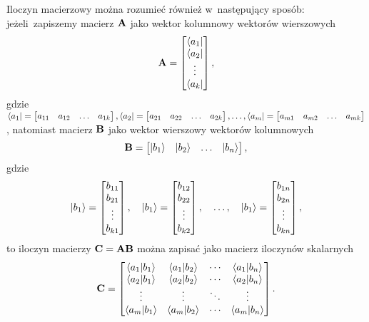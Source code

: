 Iloczyn macierzowy można rozumieć również w~następujący sposób: jeżeli~zapiszemy
macierz $\mathbf{A}$ jako wektor kolumnowy wektorów wierszowych
$$
	\mathbf{A} = \begin{bmatrix}
		\bra{a_1} \\
		\bra{a_2} \\
		\vdots    \\
		\bra{a_k}
	\end{bmatrix},
$$
gdzie $\bra{a_1} = \begin{bmatrix}a_{11} & a_{12} & \dots & a_{1k} \end{bmatrix},
	\bra{a_2} = \begin{bmatrix}a_{21} & a_{22} & \dots & a_{2k} \end{bmatrix}, \dots,
	\bra{a_m} = \begin{bmatrix}a_{m1} & a_{m2} & \dots & a_{mk} \end{bmatrix}$,
natomiast macierz $\mathbf{B}$ jako wektor wierszowy wektorów kolumnowych
$$
	\mathbf{B} = \begin{bmatrix}
		\ket{b_1} &
		\ket{b_2} &
		\dots     &
		\ket{b_n}
	\end{bmatrix},
$$
gdzie
$$
	\ket{b_1} =
	\begin{bmatrix}
		b_{11} \\
		b_{21} \\
		\vdots \\
		b_{k1}
	\end{bmatrix}, \quad
	\ket{b_1} =
	\begin{bmatrix}
		b_{12} \\
		b_{22} \\
		\vdots \\
		b_{k2}\end{bmatrix},\quad \dots, \quad
	\ket{b_1} =
	\begin{bmatrix}
		b_{1n} \\
		b_{2n} \\
		\vdots \\
		b_{kn}
	\end{bmatrix},
$$
to iloczyn macierzy $\mathbf{C}=\mathbf{A}\mathbf{B}$ można zapisać jako macierz iloczynów skalarnych
$$
	\mathbf{C}=
	\begin{bmatrix}
		\braket{a_1}{b_1} & \braket{a_1}{b_2} & \cdots & \braket{a_1}{b_n} \\
		\braket{a_2}{b_1} & \braket{a_2}{b_2} & \cdots & \braket{a_2}{b_n} \\
		\vdots            & \vdots            & \ddots & \vdots            \\
		\braket{a_m}{b_1} & \braket{a_m}{b_2} & \cdots & \braket{a_m}{b_n} \\
	\end{bmatrix}.
$$

